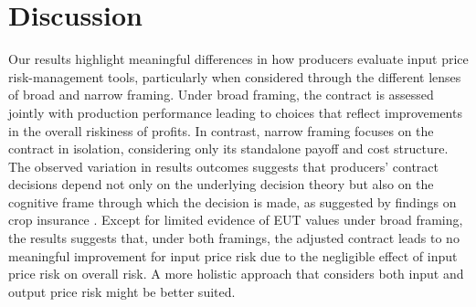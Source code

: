 \documentclass[12pt,a4paper]{article}
\begin{document}
\begin{table}[H]
\centering
\caption{CPT results under narrow framing}
\label{tab:CPT_narrow}
\end{table}

\section{Discussion}
\label{sec:discussion}

Our results highlight meaningful differences in how producers evaluate input price risk-management tools, particularly when considered through the different lenses of broad and narrow framing. Under broad framing, the contract is assessed jointly with production performance leading to choices that reflect improvements in the overall riskiness of profits. In contrast, narrow framing focuses on the contract in isolation, considering only its standalone payoff and cost structure. The observed variation in results outcomes suggests that producers' contract decisions depend not only on the underlying decision theory but also on the cognitive frame through which the decision is made, as suggested by findings on crop insurance \citep{Babcock2015, Dalhaus2020}. Except for limited evidence of EUT values under broad framing, the results suggests that, under both framings, the adjusted contract leads to no meaningful improvement for input price risk due to the negligible effect of input price risk on overall risk. A more holistic approach that considers both input and output price risk might be better suited.
\end{document}
